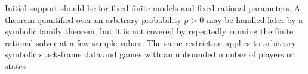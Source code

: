 Initial support should be for fixed finite models and fixed rational
parameters. A theorem quantified over an arbitrary probability $p>0$ may be
handled later by a symbolic family theorem, but it is not covered by repeatedly
running the finite rational solver at a few sample values. The same restriction
applies to arbitrary symbolic stack-frame data and games with an unbounded
number of players or states.
